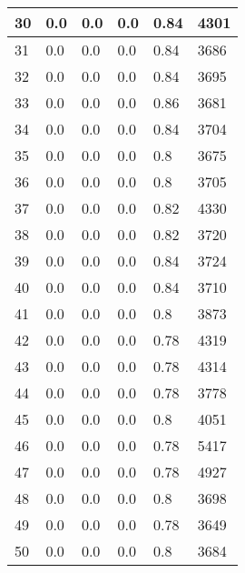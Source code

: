 \begin{longtable}{|l|l|l|l|l|l|}
30 & 0.0 & 0.0 & 0.0 & 0.84 & 4301 \\ \hline 
31 & 0.0 & 0.0 & 0.0 & 0.84 & 3686 \\ \hline 
32 & 0.0 & 0.0 & 0.0 & 0.84 & 3695 \\ \hline 
33 & 0.0 & 0.0 & 0.0 & 0.86 & 3681 \\ \hline 
34 & 0.0 & 0.0 & 0.0 & 0.84 & 3704 \\ \hline 
35 & 0.0 & 0.0 & 0.0 & 0.8 & 3675 \\ \hline 
36 & 0.0 & 0.0 & 0.0 & 0.8 & 3705 \\ \hline 
37 & 0.0 & 0.0 & 0.0 & 0.82 & 4330 \\ \hline 
38 & 0.0 & 0.0 & 0.0 & 0.82 & 3720 \\ \hline 
39 & 0.0 & 0.0 & 0.0 & 0.84 & 3724 \\ \hline 
40 & 0.0 & 0.0 & 0.0 & 0.84 & 3710 \\ \hline 
41 & 0.0 & 0.0 & 0.0 & 0.8 & 3873 \\ \hline 
42 & 0.0 & 0.0 & 0.0 & 0.78 & 4319 \\ \hline 
43 & 0.0 & 0.0 & 0.0 & 0.78 & 4314 \\ \hline 
44 & 0.0 & 0.0 & 0.0 & 0.78 & 3778 \\ \hline 
45 & 0.0 & 0.0 & 0.0 & 0.8 & 4051 \\ \hline 
46 & 0.0 & 0.0 & 0.0 & 0.78 & 5417 \\ \hline 
47 & 0.0 & 0.0 & 0.0 & 0.78 & 4927 \\ \hline 
48 & 0.0 & 0.0 & 0.0 & 0.8 & 3698 \\ \hline 
49 & 0.0 & 0.0 & 0.0 & 0.78 & 3649 \\ \hline 
50 & 0.0 & 0.0 & 0.0 & 0.8 & 3684 \\ \hline 
\end{longtable}